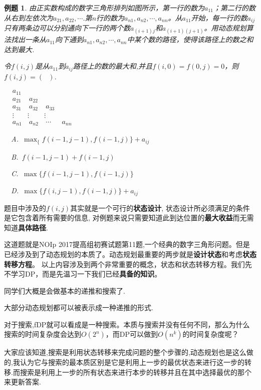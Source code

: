 \documentclass{article}
\newtheorem{example}{例题}[subsection]
\theoremstyle{nonumberplain}
\begin{document}
\begin{example}由正实数构成的数字三角形排列如图所示，第一行的数为$a_{11}$；第二行的数从右到左依次为$a_{21},a_{22},\cdots$.第$n$行的数为$a_{n1},a_{n2},\cdots,a_{nn}$。从$a_{11}$开始，每一行的数$a_{ij}$只有两条边可以分别通向下一行的两个数$a_{(i+1)j}$和$a_{(i+1)(j+1)}$。用动态规划算法找出一条从$a_{11}$向下通到$a_{n1},a_{n2},\cdots,a_{nn}$中某个数的路径，使得该路径上的数之和达到最大.

	令$f(i,j)$是从$a_{11}$到$a_{ij}$路径上的数的最大和,并且$f(i,0)=f(0,j)=0$，则$f(i,j)=(\ \ \ )$.
	\begin{center}
		\begin{math}
			\begin{matrix}
				&a_{11}&         \\
				&a_{21}&\ a_{22}         \\
				&a_{31}&\ a_{32}&\ a_{33} \\
				&\vdots&\vdots&\vdots&       \\
				&a_{n1}&\ a_{n2}&\ \cdots&\ a_{nn}
			\end{matrix}
		\end{math}
	\end{center}

	\ \ A.\ $\max_\{f(i-1,j-1),f(i-1,j)\}+a_{ij}$

	\ \ B.\ $f(i-1,j-1)+f(i-1,j)$

	\ \ C.\ $\max\{f(i-1,j-1),f(i-1,j)\}$

	\ \ D.\ $\max\{f(i,j-1),f(i-1,j)\}+a_{ij}$
\end{example}

题目中涉及的$f(i,j)$其实就是一个可行的\textbf{状态设计}, 状态设计所必须满足的条件是它包含着所有需要的信息, 对例题来说只需要知道此到达位置的\textbf{最大收益}而无需知道\textbf{具体路径}.

这道题就是NOIp 2017提高组初赛试题第11题,一个经典的数字三角形问题。但是已经涉及到了动态规划的本质了。动态规划最重要的两步就是\textbf{设计状态}和考虑\textbf{状态转移方程}。
以上内容涉及到两个非常重要的概念，状态和状态转移方程。我们先不学习DP，而是先温习一下我们已经\textbf{具备的知识}。

同学们大概是会做基本的递推和搜索了.

大部分动态规划都可以被表示成一种递推的形式.

对于搜索,fDP就可以看成是一种搜索。本质与搜索并没有任何不同，那么为什么搜索的时间复杂度会达到$O(2^n)$，而DP可以做到$O(n^k)$的时间复杂度呢？

大家应该知道,搜索是利用状态转移来完成问题的整个步骤的,动态规划也是这么做的,我认为它与搜索的最本质区别是它是利用上一步的最优状态来进行这一步的转移.而搜索是利用上一步的所有状态来进行本步的转移并且在其中选择最优的那个来更新答案.
\end{document}
